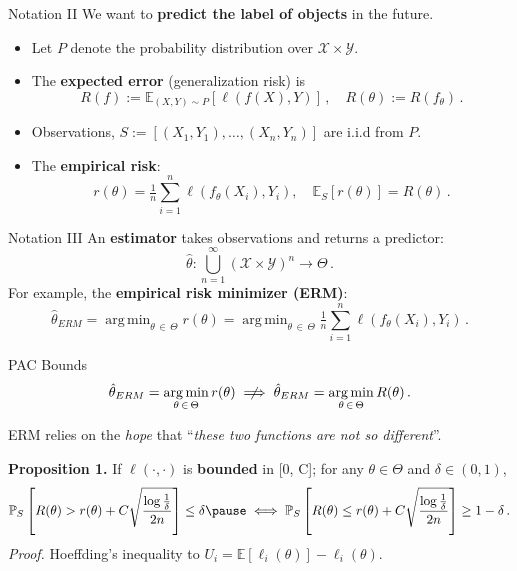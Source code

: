 \documentclass[aspectratio=159]{beamer}
\DeclareMathOperator*{\argmin}{arg\,min}
\begin{document}
    \begin{frame}{Notation II}
        We want to \textbf{predict the label of objects} in the future.\pause
        \begin{itemize}[<+->]
            \item Let \(P\) denote the probability distribution over \(\mathcal{X} \times \mathcal{Y}\). 
            \item The \textbf{expected error} (generalization risk) is 
            \[
                R(f) := \mathbb{E}_{(X, Y) \sim P}[\ell(f(X), Y)]\,, \quad R(\theta) := R(f_\theta)\,.
            \]
            \item Observations, \(S := [(X_1, Y_1),\dots , (X_n, Y_n)] \) are i.i.d from \(P\).
            \item The \textbf{empirical risk}:
            \[r(\theta) = \tfrac{1}{n}\sum_{i=1}^n \ell(f_\theta(X_i), Y_i), \quad \mathbb{E}_{S}[r(\theta)] = R(\theta)\,.\]
        \end{itemize}
    \end{frame}
    \begin{frame}{Notation III}
            An \textbf{estimator} takes observations and returns a predictor:
            \[
                \hat{\theta}: \bigcup_{n=1}^{\infty}(\mathcal{X} \times \mathcal{Y})^n \to \Theta\,.
            \]\pause
            For example, the \textbf{empirical risk minimizer (ERM)}:
            \[
                \hat{\theta}_{ERM} = \argmin_{\theta \, \in \, \Theta} r(\theta) = \argmin_{\theta \, \in\,  \Theta} \tfrac{1}{n}\sum_{i=1}^n \ell(f_\theta(X_i), Y_i)\,.
            \]
    \end{frame}

    \begin{frame}{PAC Bounds}
        \[
        \hat{\theta}_{ERM} = \argmin_{\theta \, \in \, \Theta} r(\theta) \centernot \implies \hat{\theta}_{ERM} = \argmin_{\theta \, \in \, \Theta} R(\theta)\,.
        \]

        ERM relies on the \textit{hope} that ``\textit{these two functions are not so different}''. \pause

        \textbf{Proposition 1.} If \(\ell(\cdot, \cdot)\) is \textbf{bounded} in [0, C]; for any \(\theta \in \Theta\) and \(\delta \in (0,1)\), 
        \[
        \mathbb{P}_{S}\left[ R(\theta) > r(\theta) + C\sqrt{\frac{\log \frac{1}{\delta}}{2n}} \right] \leq \delta \pause \iff \mathbb{P}_{S}\left[ R(\theta) \leq r(\theta) + C\sqrt{\frac{\log \frac{1}{\delta}}{2n}} \right] \geq 1- \delta\,.
        \]  
        \textit{Proof. } Hoeffding’s inequality to \(U_i = \mathbb{E}[\ell_i(\theta)] - \ell_i(\theta)\).
    \end{frame}
\end{document}
